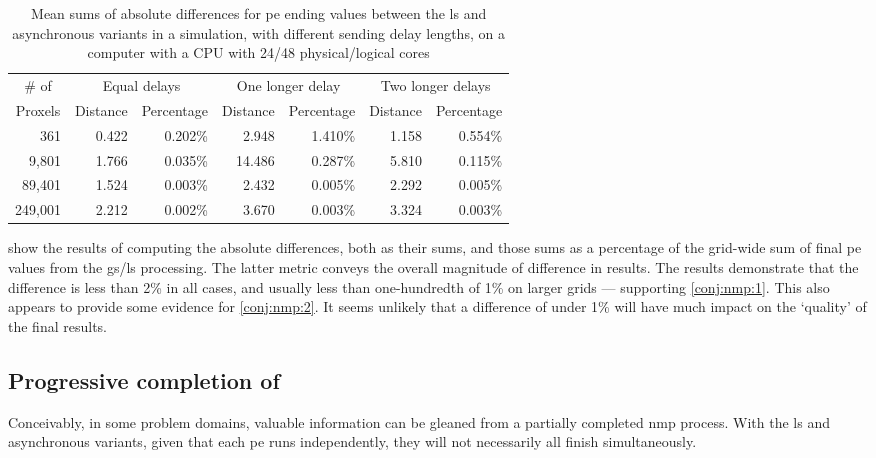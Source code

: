 \begin{table}
\centering
\begin{tabular}{@{}r|rr|rr|rr@{}}
\toprule
\multicolumn{1}{c|}{\# of}   & \multicolumn{2}{c|}{Equal delays} & \multicolumn{2}{c|}{One longer delay} & \multicolumn{2}{c}{Two longer delays} \\ \cmidrule(l){2-7} 
\multicolumn{1}{c|}{Proxels} & Distance     & Percentage     & Distance      & Percentage      & Distance      & Percentage      \\ \midrule
361  & 0.422 & 0.202\% & 2.948 & 1.410\% & 1.158 & 0.554\% \\
9,801  & 1.766 & 0.035\% & 14.486 & 0.287\% & 5.810 & 0.115\% \\
89,401  & 1.524 & 0.003\% & 2.432 & 0.005\% & 2.292 & 0.005\% \\
249,001  & 2.212 & 0.002\% & 3.670 & 0.003\% & 3.324 & 0.003\% \\ \bottomrule
\end{tabular}%
\caption[Mean sums of absolute differences for  ending values between the \gls{ls} and asynchronous variants on a 48-core CPU]{Mean sums of absolute differences for \gls{pe} ending values between the \gls{ls} and asynchronous variants in a simulation, with different sending delay lengths, on a computer with a CPU with 24/48 physical/logical cores}
\label{tab:nmp:diffs48cores}
\end{table}

 show the results of computing the absolute differences, both as their sums, and those sums as a percentage of the grid-wide sum of final \gls{pe} values from the \gls{gs}/\gls{ls} processing.  The latter metric conveys the overall magnitude of difference in results.  The results demonstrate that the difference is less than 2\% in all cases, and usually less than one-hundredth of 1\% on larger grids --- supporting \cref{conj:nmp:1}.  This also appears to provide some evidence for \cref{conj:nmp:2}.  It seems unlikely that a difference of under 1\% will have much impact on the `quality' of the final results.

\subsection{Progressive completion of }
Conceivably, in some problem domains, valuable information can be gleaned from a partially completed \gls{nmp} process.  With the \gls{ls} and asynchronous variants, given that each \gls{pe} runs independently, they will not necessarily all finish simultaneously.

